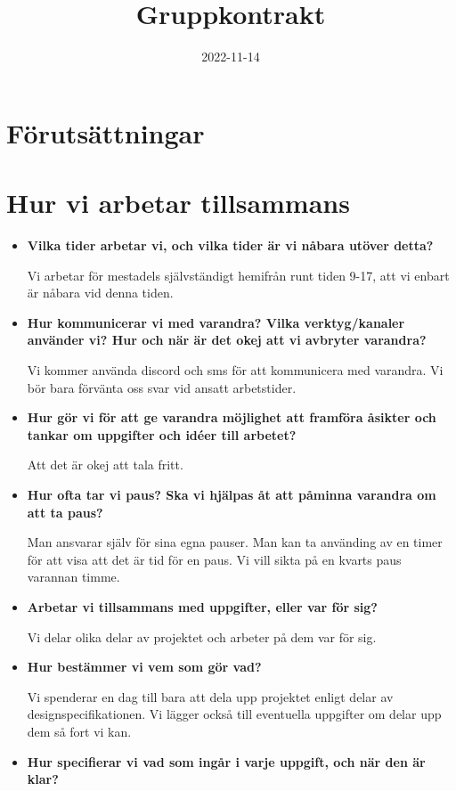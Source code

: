 \documentclass{mall}
\author{David Dumminsek, \url davdu153@student.liu.se\\
Haris Basic, \url harba466@student.liu.se }
\title{Gruppkontrakt}
\date{2022-11-14}
\begin{document}
\projectpage
\section{Förutsättningar}
\label{prereq}
\section{Hur vi arbetar tillsammans}


\begin{itemize}
\item \textbf{Vilka tider arbetar vi, och vilka tider är vi nåbara utöver detta?}

Vi arbetar för mestadels självständigt hemifrån runt tiden 9-17, att vi enbart är nåbara vid denna tiden. 

\item \textbf{Hur kommunicerar vi med varandra? Vilka verktyg/kanaler använder vi? Hur och när är det okej att vi avbryter varandra?}

Vi kommer använda discord och sms för att kommunicera med varandra. Vi bör bara förvänta oss svar vid ansatt arbetstider.

\item \textbf{Hur gör vi för att ge varandra möjlighet att framföra åsikter och tankar om uppgifter och idéer till arbetet?}

Att det är okej att tala fritt.

\item \textbf{Hur ofta tar vi paus? Ska vi hjälpas åt att påminna varandra om att ta paus?}

Man ansvarar själv för sina egna pauser. Man kan ta använding av en timer för att visa att det är tid för en paus.
Vi vill sikta på en kvarts paus varannan timme.

\item \textbf{Arbetar vi tillsammans med uppgifter, eller var för sig?}

Vi delar olika delar av projektet och arbeter på dem var för sig.

\item \textbf{Hur bestämmer vi vem som gör vad?}

Vi spenderar en dag till bara att dela upp projektet enligt delar av designspecifikationen.
Vi lägger också till eventuella uppgifter om delar upp dem så fort vi kan.

\item \textbf{Hur specifierar vi vad som ingår i varje uppgift, och när den är klar?}


\end{itemize}
\end{document}
